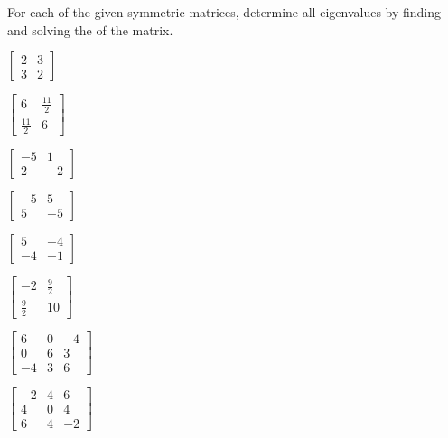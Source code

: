 \begin{exercise}  
For each of the given symmetric matrices, determine all eigenvalues by finding and solving the  of the matrix.
\begin{Parts}
\item \(\begin{bmatrix} 2&3\\3&2 \end{bmatrix}\)
\item \(\begin{bmatrix} 6&\frac{11}2\\\frac{11}2&6 \end{bmatrix}\)
\item \(\begin{bmatrix} -5&1\\2&-2 \end{bmatrix}\)
\item \(\begin{bmatrix} -5&5\\5&-5 \end{bmatrix}\)

\begin{reduce}
\item \(\begin{bmatrix} 5&-4\\-4&-1 \end{bmatrix}\)
\item \(\begin{bmatrix} -2&\frac92\\\frac92&10 \end{bmatrix}\)
\item \(\begin{bmatrix}6&0&-4
\\0&6&3
\\-4&3&6
 \end{bmatrix}\)
\item \(\begin{bmatrix}-2&4&6
\\4&0&4
\\6&4&-2
 \end{bmatrix}\)
\end{reduce}


\end{Parts}
\end{exercise}
